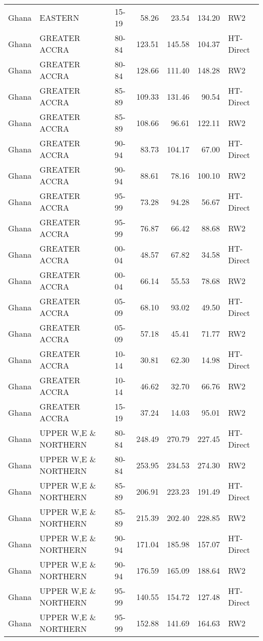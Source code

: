 \begin{longtable}{lllrrrl}
  Ghana & EASTERN & 15-19 & 58.26 & 23.54 & 134.20 & RW2 \\ 
  Ghana & GREATER ACCRA & 80-84 & 123.51 & 145.58 & 104.37 & HT-Direct \\ 
  Ghana & GREATER ACCRA & 80-84 & 128.66 & 111.40 & 148.28 & RW2 \\ 
  Ghana & GREATER ACCRA & 85-89 & 109.33 & 131.46 & 90.54 & HT-Direct \\ 
  Ghana & GREATER ACCRA & 85-89 & 108.66 & 96.61 & 122.11 & RW2 \\ 
  Ghana & GREATER ACCRA & 90-94 & 83.73 & 104.17 & 67.00 & HT-Direct \\ 
  Ghana & GREATER ACCRA & 90-94 & 88.61 & 78.16 & 100.10 & RW2 \\ 
  Ghana & GREATER ACCRA & 95-99 & 73.28 & 94.28 & 56.67 & HT-Direct \\ 
  Ghana & GREATER ACCRA & 95-99 & 76.87 & 66.42 & 88.68 & RW2 \\ 
  Ghana & GREATER ACCRA & 00-04 & 48.57 & 67.82 & 34.58 & HT-Direct \\ 
  Ghana & GREATER ACCRA & 00-04 & 66.14 & 55.53 & 78.68 & RW2 \\ 
  Ghana & GREATER ACCRA & 05-09 & 68.10 & 93.02 & 49.50 & HT-Direct \\ 
  Ghana & GREATER ACCRA & 05-09 & 57.18 & 45.41 & 71.77 & RW2 \\ 
  Ghana & GREATER ACCRA & 10-14 & 30.81 & 62.30 & 14.98 & HT-Direct \\ 
  Ghana & GREATER ACCRA & 10-14 & 46.62 & 32.70 & 66.76 & RW2 \\ 
  Ghana & GREATER ACCRA & 15-19 & 37.24 & 14.03 & 95.01 & RW2 \\ 
  Ghana & UPPER W,E \& NORTHERN & 80-84 & 248.49 & 270.79 & 227.45 & HT-Direct \\ 
  Ghana & UPPER W,E \& NORTHERN & 80-84 & 253.95 & 234.53 & 274.30 & RW2 \\ 
  Ghana & UPPER W,E \& NORTHERN & 85-89 & 206.91 & 223.23 & 191.49 & HT-Direct \\ 
  Ghana & UPPER W,E \& NORTHERN & 85-89 & 215.39 & 202.40 & 228.85 & RW2 \\ 
  Ghana & UPPER W,E \& NORTHERN & 90-94 & 171.04 & 185.98 & 157.07 & HT-Direct \\ 
  Ghana & UPPER W,E \& NORTHERN & 90-94 & 176.59 & 165.09 & 188.64 & RW2 \\ 
  Ghana & UPPER W,E \& NORTHERN & 95-99 & 140.55 & 154.72 & 127.48 & HT-Direct \\ 
  Ghana & UPPER W,E \& NORTHERN & 95-99 & 152.88 & 141.69 & 164.63 & RW2 \\ 

\end{longtable}
